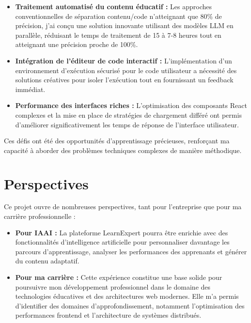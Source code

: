 \documentclass[12pt, a4paper]{report}
\begin{document}
\begin{itemize}
  \item \textbf{Traitement automatisé du contenu éducatif :} Les approches conventionnelles de séparation contenu/code n'atteignant que 80\% de précision, j'ai conçu une solution innovante utilisant des modèles LLM en parallèle, réduisant le temps de traitement de 15 à 7-8 heures tout en atteignant une précision proche de 100\%.
  
  \item \textbf{Intégration de l'éditeur de code interactif :} L'implémentation d'un environnement d'exécution sécurisé pour le code utilisateur a nécessité des solutions créatives pour isoler l'exécution tout en fournissant un feedback immédiat.
  
  \item \textbf{Performance des interfaces riches :} L'optimisation des composants React complexes et la mise en place de stratégies de chargement différé ont permis d'améliorer significativement les temps de réponse de l'interface utilisateur.
\end{itemize}

Ces défis ont été des opportunités d'apprentissage précieuses, renforçant ma capacité à aborder des problèmes techniques complexes de manière méthodique.

\section{Perspectives}

Ce projet ouvre de nombreuses perspectives, tant pour l'entreprise que pour ma carrière professionnelle :

\begin{itemize}
  \item \textbf{Pour IAAI :} La plateforme LearnExpert pourra être enrichie avec des fonctionnalités d'intelligence artificielle pour personnaliser davantage les parcours d'apprentissage, analyser les performances des apprenants et générer du contenu adaptatif.
  
  \item \textbf{Pour ma carrière :} Cette expérience constitue une base solide pour poursuivre mon développement professionnel dans le domaine des technologies éducatives et des architectures web modernes. Elle m'a permis d'identifier des domaines d'approfondissement, notamment l'optimisation des performances frontend et l'architecture de systèmes distribués.
\end{itemize}
\end{document}
